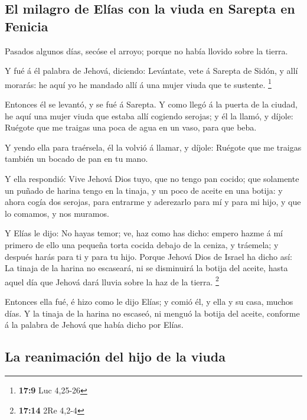 \hypertarget{el-milagro-de-eluxedas-con-la-viuda-en-sarepta-en-fenicia}{%
\subsection{El milagro de Elías con la viuda en Sarepta en
Fenicia}\label{el-milagro-de-eluxedas-con-la-viuda-en-sarepta-en-fenicia}}

 Pasados algunos días, secóse el arroyo; porque no había
llovido sobre la tierra.

 Y fué á él palabra de Jehová, diciendo: 
Levántate, vete á Sarepta de Sidón, y allí morarás: he aquí yo he
mandado allí á una mujer viuda que te sustente. \footnote{\textbf{17:9}
  Luc 4,25-26}

 Entonces él se levantó, y se fué á Sarepta. Y como llegó
á la puerta de la ciudad, he aquí una mujer viuda que estaba allí
cogiendo serojas; y él la llamó, y díjole: Ruégote que me traigas una
poca de agua en un vaso, para que beba.

 Y yendo ella para traérsela, él la volvió á llamar, y
díjole: Ruégote que me traigas también un bocado de pan en tu mano.

 Y ella respondió: Vive Jehová Dios tuyo, que no tengo
pan cocido; que solamente un puñado de harina tengo en la tinaja, y un
poco de aceite en una botija: y ahora cogía dos serojas, para entrarme y
aderezarlo para mí y para mi hijo, y que lo comamos, y nos muramos.

 Y Elías le dijo: No hayas temor; ve, haz como has dicho:
empero hazme á mí primero de ello una pequeña torta cocida debajo de la
ceniza, y tráemela; y después harás para ti y para tu hijo.
 Porque Jehová Dios de Israel ha dicho así: La tinaja de
la harina no escaseará, ni se disminuirá la botija del aceite, hasta
aquel día que Jehová dará lluvia sobre la haz de la tierra. \footnote{\textbf{17:14}
  2Re 4,2-4}

 Entonces ella fué, é hizo como le dijo Elías; y comió
él, y ella y su casa, muchos días.  Y la tinaja de la
harina no escaseó, ni menguó la botija del aceite, conforme á la palabra
de Jehová que había dicho por Elías.

\hypertarget{la-reanimaciuxf3n-del-hijo-de-la-viuda}{%
\subsection{La reanimación del hijo de la
viuda}\label{la-reanimaciuxf3n-del-hijo-de-la-viuda}}

